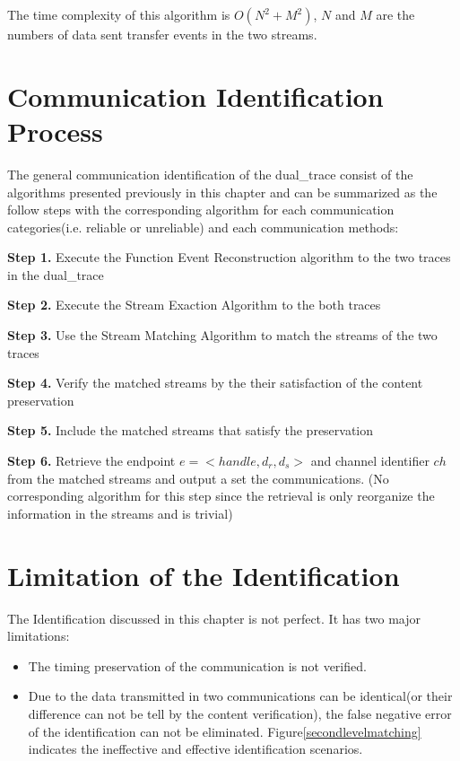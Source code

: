 The time complexity of this algorithm is $O(N^2+M^2)$, $N$ and $M$ are the numbers of data sent transfer events in the two streams.

\section{Communication Identification Process}
The general communication identification of the dual\_trace consist of the algorithms presented previously in this chapter and can be summarized as the follow steps with the corresponding algorithm for each communication categories(i.e. reliable or unreliable) and each communication methods:

\textbf{Step 1.} Execute the Function Event Reconstruction algorithm to the two traces in the dual\_trace

\textbf{Step 2.} Execute the Stream Exaction Algorithm to the both traces 

\textbf{Step 3.} Use the Stream Matching Algorithm to match the streams of the two traces

\textbf{Step 4.} Verify the matched streams by the their satisfaction of the content preservation

\textbf{Step 5.}  Include the matched streams that satisfy the preservation

\textbf{Step 6.}  Retrieve the endpoint $e =<handle,  d_r, d_s>$ and channel identifier $ch$ from the matched streams and output a set the communications. (No corresponding algorithm for this step since the retrieval is only reorganize the information in the streams and is trivial)


\section{Limitation of the Identification}
The Identification discussed in this chapter is not perfect. It has two major limitations:
\begin{itemize}
    \item The timing preservation of the communication is not verified.
    \item Due to the data transmitted in two communications can be identical(or their difference can not be tell by the content verification), the false negative error of the identification can not be eliminated. Figure\ref{secondlevelmatching} indicates the ineffective and effective identification scenarios. 
\end{itemize}



